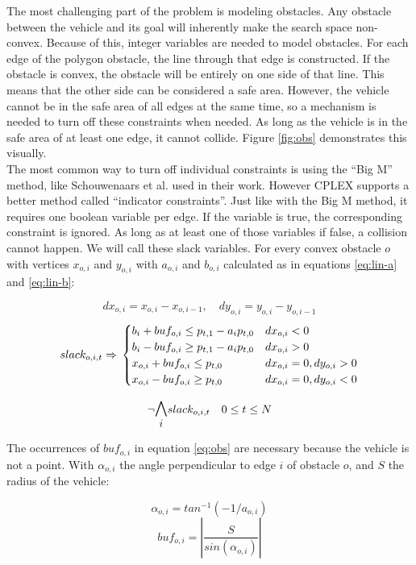 The most challenging part of the problem is modeling obstacles. Any obstacle between the vehicle and its goal will inherently make the search space non-convex. Because of this, integer variables are needed to model obstacles. For each edge of the polygon obstacle, the line through that edge is constructed. If the obstacle is convex, the obstacle will be entirely on one side of that line. This means that the other side can be considered a safe area. However, the vehicle cannot be in the safe area of all edges at the same time, so a mechanism is needed to turn off these constraints when needed. As long as the vehicle is in the safe area of at least one edge, it cannot collide.  Figure \ref{fig:obs} demonstrates this visually. \\
The most common way to turn off individual constraints is using the ``Big M'' method, like Schouwenaars et al. \cite{Schouwenaars2001} used in their work. However CPLEX supports a better method called ``indicator constraints''. Just like with the Big M method, it requires one boolean variable per edge. If the variable is true, the corresponding constraint is ignored. As long as at least one of those variables if false, a collision cannot happen. We will call these slack variables. For every convex obstacle $o$ with vertices $x_{o,i}$ and $y_{o,i}$ with $a_{o,i}$ and $b_{o,i}$ calculated as in equations \ref{eq:lin-a} and \ref{eq:lin-b}:

\begin{equation*}
dx_{o,i} = x_{o,i} - x_{o,i-1}, \quad dy_{o,i} = y_{o,i} - y_{o,i-1}
\end{equation*}
\begin{equation}
\label{eq:obs}
slack_{o,i,t} \Rightarrow \\
\begin{cases}
b_i + buf_{o,i} \leq p_{t,1} - a_i p_{t,0} & dx_{o,i} < 0 \\
b_i - buf_{o,i}  \geq p_{t,1} - a_i p_{t,0} & dx_{o,i} > 0 \\
x_{o,i} + buf_{o,i}  \leq p_{t,0} & dx_{o,i} = 0, dy_{o,i} > 0 \\
x_{o,i} - buf_{o,i}  \geq p_{t,0} & dx_{o,i} = 0, dy_{o,i} < 0 \\
\end{cases}
\end{equation}

\begin{equation}
\neg \mathlarger{\mathlarger{\bigwedge_{i}}} slack_{o,i,t} \quad 0 \leq t \leq N
\end{equation}

The occurrences of $buf_{o,i}$ in equation \ref{eq:obs} are necessary because the vehicle is not a point. With $\alpha_{o,i}$ the angle perpendicular to edge $i$ of obstacle $o$, and $S$ the radius of the vehicle:

\begin{equation}
\alpha_{o,i} = tan^{-1}( -1 / a_{o,i})
\end{equation}
\begin{equation}
buf_{o,i} = |\dfrac{S}{sin(\alpha_{o,i})}|
\end{equation}